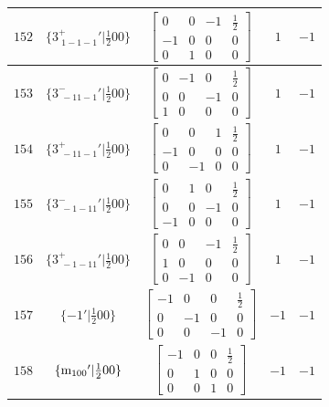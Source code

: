 \documentclass[fleqn,8pt]{jsarticle}
\begin{document}
\begin{longtable}{ccccc}
$ 152 $ & $ \{3^{+}_{\,\,1-1-1}{}'|\frac{1}{2} 0 0\} $ & $ \begin{bmatrix} 0 & 0 & -1 & \frac{1}{2} \\ -1 & 0 & 0 & 0 \\ 0 & 1 & 0 & 0 \end{bmatrix} $ & $ 1 $ & $ -1 $ \\ \hline
$ 153 $ & $ \{3^{-}_{\,\,-11-1}{}'|\frac{1}{2} 0 0\} $ & $ \begin{bmatrix} 0 & -1 & 0 & \frac{1}{2} \\ 0 & 0 & -1 & 0 \\ 1 & 0 & 0 & 0 \end{bmatrix} $ & $ 1 $ & $ -1 $ \\ \hline
$ 154 $ & $ \{3^{+}_{\,\,-11-1}{}'|\frac{1}{2} 0 0\} $ & $ \begin{bmatrix} 0 & 0 & 1 & \frac{1}{2} \\ -1 & 0 & 0 & 0 \\ 0 & -1 & 0 & 0 \end{bmatrix} $ & $ 1 $ & $ -1 $ \\ \hline
$ 155 $ & $ \{3^{-}_{\,\,-1-11}{}'|\frac{1}{2} 0 0\} $ & $ \begin{bmatrix} 0 & 1 & 0 & \frac{1}{2} \\ 0 & 0 & -1 & 0 \\ -1 & 0 & 0 & 0 \end{bmatrix} $ & $ 1 $ & $ -1 $ \\ \hline
$ 156 $ & $ \{3^{+}_{\,\,-1-11}{}'|\frac{1}{2} 0 0\} $ & $ \begin{bmatrix} 0 & 0 & -1 & \frac{1}{2} \\ 1 & 0 & 0 & 0 \\ 0 & -1 & 0 & 0 \end{bmatrix} $ & $ 1 $ & $ -1 $ \\ \hline
$ 157 $ & $ \{-1{}'|\frac{1}{2} 0 0\} $ & $ \begin{bmatrix} -1 & 0 & 0 & \frac{1}{2} \\ 0 & -1 & 0 & 0 \\ 0 & 0 & -1 & 0 \end{bmatrix} $ & $ -1 $ & $ -1 $ \\ \hline
$ 158 $ & $ \{{\rm m}_{100}{}'|\frac{1}{2} 0 0\} $ & $ \begin{bmatrix} -1 & 0 & 0 & \frac{1}{2} \\ 0 & 1 & 0 & 0 \\ 0 & 0 & 1 & 0 \end{bmatrix} $ & $ -1 $ & $ -1 $ \\ \hline

\end{longtable}
\end{document}
